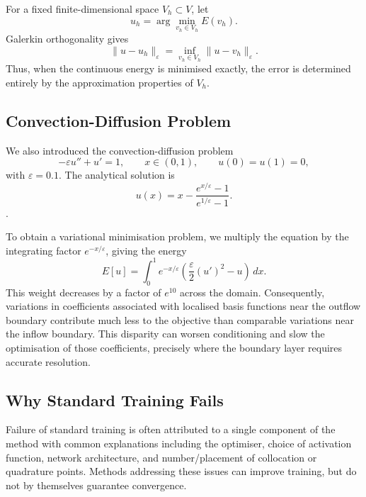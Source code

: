 \documentclass[11pt, onecolumn]{report}
\begin{document}
For a fixed finite-dimensional space \(V_h\subset V\), let
\begin{equation*}
    u_h=\arg\min_{v_h\in V_h}E(v_h).
\end{equation*}
Galerkin orthogonality gives
\begin{equation}
    \|u-u_h\|_\varepsilon
    =
    \inf_{v_h\in V_h}
    \|u-v_h\|_\varepsilon.
    \label{eq:ritz_best_approximation}
\end{equation}
Thus, when the continuous energy is minimised exactly, the error is determined entirely by the approximation properties of \(V_h\).

\subsection{Convection-Diffusion Problem}
We also introduced the convection-diffusion problem
\begin{equation*}
-\varepsilon u''+u'=1,\qquad x\in(0,1),\qquad u(0)=u(1)=0,
\end{equation*}
with $\varepsilon=0.1$. 
The analytical solution is
\begin{equation*}
u(x)=x-\frac{e^{x/\varepsilon}-1}{e^{1/\varepsilon}-1}.
\end{equation*}.

To obtain a variational minimisation problem, we multiply the equation by the integrating factor $e^{-x/\varepsilon}$, giving the energy
\begin{equation*}
E[u]=\int_0^1 e^{-x/\varepsilon}\left(\frac{\varepsilon}{2}(u')^2-u\right)\,dx.
\end{equation*}
This weight decreases by a factor of $e^{10}$ across the domain. Consequently, variations in coefficients associated with localised basis functions near the outflow boundary contribute much less to the objective than comparable variations near the inflow boundary. This disparity can worsen conditioning and slow the optimisation of those coefficients, precisely where the boundary layer requires accurate resolution.


\subsection{Why Standard Training Fails}
Failure of standard training is often attributed to a single component of the method with common explanations including the optimiser, choice of activation function, network architecture, and number/placement of collocation or quadrature points. Methods addressing these issues can improve training, but do not by themselves guarantee convergence.
\end{document}
